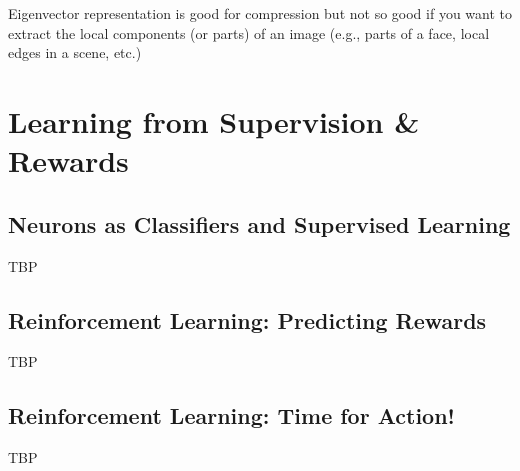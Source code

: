 \documentclass[]{article}
\begin{document}
Eigenvector representation is good for compression but not so good if you want to extract the local components (or parts) of an image (e.g., parts of a face, local edges in a scene, etc.)

\section{Learning from Supervision \& Rewards}\label{sec:week8}

\subsection{Neurons as Classifiers and Supervised Learning}
TBP

\subsection{Reinforcement Learning: Predicting Rewards}
TBP

\subsection{Reinforcement Learning: Time for Action!}
TBP

\appendix

\printglossaries




\end{document}
